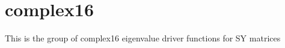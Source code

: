 \hypertarget{group__complex16SYeigen}{}\section{complex16}
\label{group__complex16SYeigen}
This is the group of complex16 eigenvalue driver functions for S\+Y matrices 
